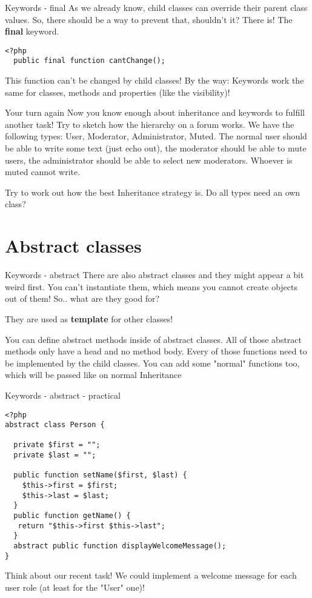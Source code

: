 \begin{frame}[fragile]{Keywords - final}
	As we already know, child classes can override their parent class values. So, there should be a way to prevent that, shouldn't it? \pause
	There is! The \textbf{final} keyword.
	\begin{lstlisting}
<?php
  public final function cantChange();
    \end{lstlisting}
    \pause
    This function can't be changed by child classes!
    By the way: Keywords work the same for classes, methods and properties (like the visibility)!
\end{frame}


\begin{frame}[fragile]{Your turn again}
	Now you know enough about inheritance and keywords to fulfill another task! \pause Try to sketch how the hierarchy on a forum works. We have the following types: User, Moderator, Administrator, Muted. The normal user should be able to write some text (just echo out), the moderator should be able to mute users, the administrator should be able to select new moderators. Whoever is muted cannot write.\pause
	
	Try to work out how the best Inheritance strategy is. \pause Do all types need an own class?
\end{frame}

\section{Abstract classes}

\begin{frame}[fragile]{Keywords - abstract}
	There are also abstract classes and they might appear a bit weird first. You can't instantiate them, which means you cannot create objects out of them!
	So.. what are they good for?\pause
	
	They are used as \textbf{template} for other classes! 
	
	You can define abstract methods inside of abstract classes. All of those abstract methods only have a head and no method body. Every of those functions need to be implemented by the child classes. You can add some "normal" functions too, which will be passed like on normal Inheritance
\end{frame}

\begin{frame}[fragile]{Keywords - abstract - practical}
	\begin{lstlisting}
<?php
abstract class Person {
 
  private $first = ""; 
  private $last = "";
 
  public function setName($first, $last) {
    $this->first = $first;
    $this->last = $last;
  }
  public function getName() {
   return "$this->first $this->last";
  }
  abstract public function displayWelcomeMessage();
}
	\end{lstlisting}
	\pause
	Think about our recent task! We could implement a welcome message for each user role (at least for the "User" one)!
\end{frame}

